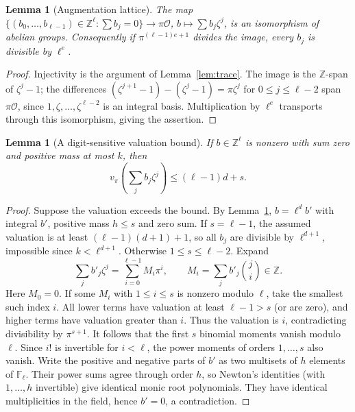 \documentclass[11pt]{article}
\newtheorem{lemma}[theorem]{Lemma}
\theoremstyle{remark}\newtheorem{remark}[theorem]{Remark}
\newcommand{\F}{\mathbb F}
\newcommand{\Z}{\mathbb Z}
\begin{document}
\begin{lemma}[Augmentation lattice]\label{lem:aug}
The map $\{(b_0,\ldots,b_{\ell-1})\in\Z^\ell:\sum b_j=0\}\to\pi\mathcal O$, $b\mapsto\sum b_j\zeta^j$, is an isomorphism of abelian groups. Consequently if $\pi^{(\ell-1)e+1}$ divides the image, every $b_j$ is divisible by $\ell^e$.
\end{lemma}
\begin{proof}
Injectivity is the argument of Lemma~\ref{lem:trace}. The image is the $\Z$-span of $\zeta^j-1$; the differences $(\zeta^{j+1}-1)-(\zeta^j-1)=\pi\zeta^j$ for $0\le j\le\ell-2$ span $\pi\mathcal O$, since $1,\zeta,\ldots,\zeta^{\ell-2}$ is an integral basis. Multiplication by $\ell^e$ transports through this isomorphism, giving the assertion.
\end{proof}

\begin{lemma}[A digit-sensitive valuation bound]\label{lem:val}
If $b\in\Z^\ell$ is nonzero with sum zero and positive mass at most $k$, then
\[
 v_\pi\left(\sum_j b_j\zeta^j\right)\le (\ell-1)d+s.
\]
\end{lemma}
\begin{proof}
Suppose the valuation exceeds the bound. By Lemma~\ref{lem:aug}, $b=\ell^d b'$ with integral $b'$, positive mass $h\le s$ and zero sum. If $s=\ell-1$, the assumed valuation is at least $(\ell-1)(d+1)+1$, so all $b_j$ are divisible by $\ell^{d+1}$, impossible since $k<\ell^{d+1}$. Otherwise $1\le s\le\ell-2$. Expand
\[
 \sum_j b'_j\zeta^j=\sum_{i=0}^{\ell-1}M_i\pi^i,\qquad M_i=\sum_j b'_j\binom ji\in\Z.
\]
Here $M_0=0$. If some $M_i$ with $1\le i\le s$ is nonzero modulo $\ell$, take the smallest such index $i$. All lower terms have valuation at least $\ell-1>s$ (or are zero), and higher terms have valuation greater than $i$. Thus the valuation is $i$, contradicting divisibility by $\pi^{s+1}$. It follows that the first $s$ binomial moments vanish modulo $\ell$. Since $i!$ is invertible for $i<\ell$, the power moments of orders $1,\ldots,s$ also vanish. Write the positive and negative parts of $b'$ as two multisets of $h$ elements of $\F_\ell$. Their power sums agree through order $h$, so Newton's identities (with $1,\ldots,h$ invertible) give identical monic root polynomials. They have identical multiplicities in the field, hence $b'=0$, a contradiction.
\end{proof}
\end{document}
